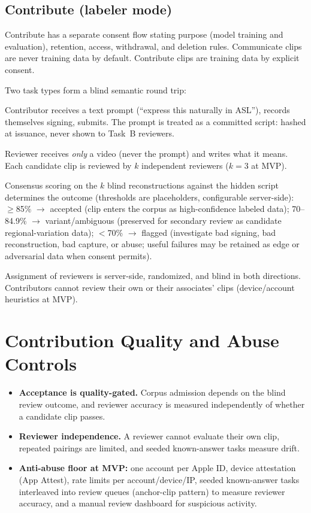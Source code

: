 \documentclass[11pt]{article}
\begin{document}
\subsection{Contribute (labeler mode)}
Contribute has a separate consent flow stating purpose (model training and
evaluation), retention, access, withdrawal, and deletion rules. Communicate clips
are never training data by default. Contribute clips are training data by explicit
consent.

Two task types form a blind semantic round trip:

\begin{description}[nosep]
  \item[Task A, meaning $\to$ sign.] Contributor receives a text prompt
        (``express this naturally in ASL''), records themselves signing, submits.
        The prompt is treated as a committed script: hashed at issuance, never shown
        to Task~B reviewers.
  \item[Task B, sign $\to$ meaning.] Reviewer receives \emph{only} a video (never
        the prompt) and writes what it means. Each candidate clip is reviewed by
        $k$ independent reviewers ($k=3$ at MVP).
\end{description}

Consensus scoring on the $k$ blind reconstructions against the hidden script
determines the outcome (thresholds are placeholders, configurable server-side):
$\geq$85\% $\to$ accepted (clip enters the corpus as high-confidence labeled data);
70--84.9\% $\to$ variant/ambiguous (preserved for secondary review as candidate
regional-variation data); $<$70\% $\to$ flagged (investigate bad signing, bad
reconstruction, bad capture, or abuse; useful failures may be retained as edge or
adversarial data when consent permits).

Assignment of reviewers is server-side, randomized, and blind in both directions.
Contributors cannot review their own or their associates' clips (device/account
heuristics at MVP).

\section{Contribution Quality and Abuse Controls}

\begin{itemize}[nosep]
  \item \textbf{Acceptance is quality-gated.} Corpus admission depends on the blind
        review outcome, and reviewer accuracy is measured independently of whether
        a candidate clip passes.
  \item \textbf{Reviewer independence.} A reviewer cannot evaluate their own clip,
        repeated pairings are limited, and seeded known-answer tasks measure drift.
  \item \textbf{Anti-abuse floor at MVP:} one account per Apple ID, device
        attestation (App Attest), rate limits per account/device/IP, seeded
        known-answer tasks interleaved into review queues (anchor-clip pattern) to
        measure reviewer accuracy, and a manual review dashboard for suspicious
        activity.
\end{itemize}
\end{document}
